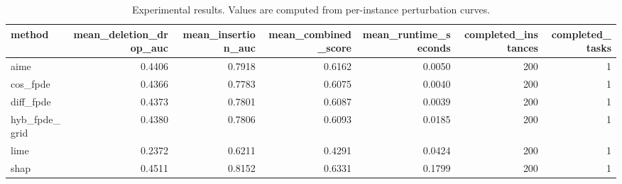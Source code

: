 \begin{table}[t]
\caption{Experimental results. Values are computed from per-instance perturbation curves.}
\label{tab:main_results_computed}
\centering
\begin{tabular}{lrrrrrr}
\toprule
method & mean\_deletion\_drop\_auc & mean\_insertion\_auc & mean\_combined\_score & mean\_runtime\_seconds & completed\_instances & completed\_tasks \\
\midrule
aime & 0.4406 & 0.7918 & 0.6162 & 0.0050 & 200 & 1 \\
cos\_fpde & 0.4366 & 0.7783 & 0.6075 & 0.0040 & 200 & 1 \\
diff\_fpde & 0.4373 & 0.7801 & 0.6087 & 0.0039 & 200 & 1 \\
hyb\_fpde\_grid & 0.4380 & 0.7806 & 0.6093 & 0.0185 & 200 & 1 \\
lime & 0.2372 & 0.6211 & 0.4291 & 0.0424 & 200 & 1 \\
shap & 0.4511 & 0.8152 & 0.6331 & 0.1799 & 200 & 1 \\
\bottomrule
\end{tabular}

\end{table}
